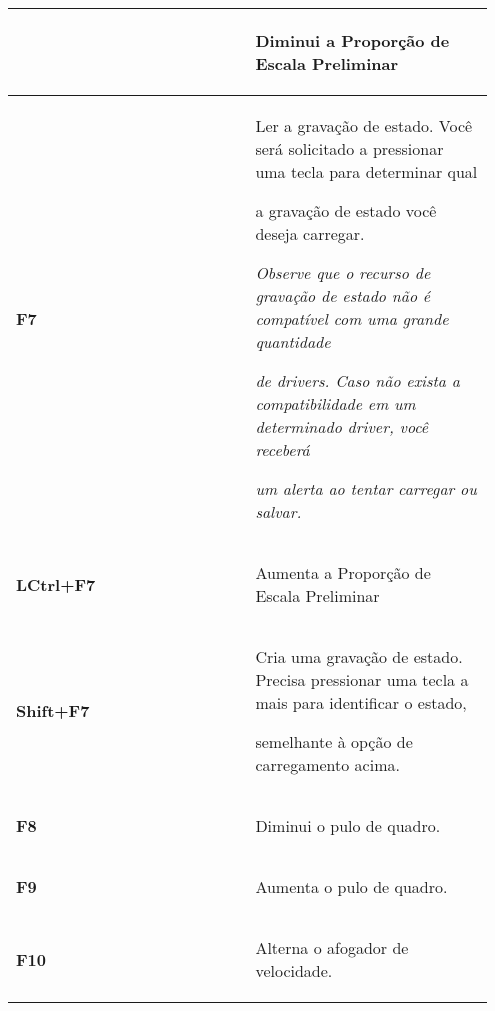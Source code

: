 \documentclass[letterpaper,10pt,brazil]{sphinxmanual}
\begin{document}
\begin{longtable}{|p{0.475\linewidth}|p{0.475\linewidth}|}
&
\begin{DUlineblock}{0em}
\item[] Diminui a Proporção de Escala Preliminar
\end{DUlineblock}
\\
\hline
\textbf{F7}
&
\begin{DUlineblock}{0em}
\item[] Ler a gravação de estado. Você será solicitado a pressionar uma tecla para determinar qual
\item[] a gravação de estado você deseja carregar.
\item[] 
\item[] \emph{Observe que o recurso de gravação de estado não é compatível com uma grande quantidade}
\item[] \emph{de drivers. Caso não exista a compatibilidade em um determinado driver, você receberá}
\item[] \emph{um alerta ao tentar carregar ou salvar.}
\end{DUlineblock}
\\
\hline
\textbf{LCtrl+F7}
&
\begin{DUlineblock}{0em}
\item[] Aumenta a Proporção de Escala Preliminar
\end{DUlineblock}
\\
\hline
\textbf{Shift+F7}
&
\begin{DUlineblock}{0em}
\item[] Cria uma gravação de estado. Precisa pressionar uma tecla a mais para identificar o estado,
\item[] semelhante à opção de carregamento acima.
\end{DUlineblock}
\\
\hline
\textbf{F8}
&
\begin{DUlineblock}{0em}
\item[] Diminui o pulo de quadro.
\end{DUlineblock}
\\
\hline
\textbf{F9}
&
\begin{DUlineblock}{0em}
\item[] Aumenta o pulo de quadro.
\end{DUlineblock}
\\
\hline
\textbf{F10}
&
\begin{DUlineblock}{0em}
\item[] Alterna o afogador de velocidade.
\end{DUlineblock}
\\
\hline

\end{longtable}
\end{document}
